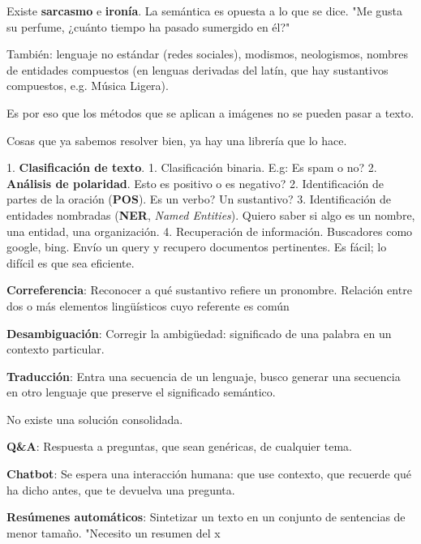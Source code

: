 \documentclass{fmbnotes}
\begin{document}
Existe \textbf{sarcasmo} e \textbf{ironía}. La semántica es opuesta a lo que se dice.
"Me gusta su perfume, ¿cuánto tiempo ha pasado sumergido en él?"

También: lenguaje no estándar (redes sociales), modismos, neologismos, nombres de entidades compuestos (en lenguas derivadas del latín, que hay sustantivos compuestos, e.g. Música Ligera).

Es por eso que los métodos que se aplican a imágenes no se pueden pasar a texto.

\label{sec:soluciones_para_nlp}

\label{sec:consolidadas}
Cosas que ya sabemos resolver bien, ya hay una librería que lo hace. 

1. \textbf{Clasificación de texto}. 
	1. Clasificación binaria. E.g: Es spam o no?
	2. \textbf{Análisis de polaridad}. Esto es positivo o es negativo?
2. Identificación de partes de la oración (\textbf{POS}). Es un verbo? Un sustantivo?
3. Identificación de entidades nombradas (\textbf{NER}, \textit{Named Entities}). Quiero saber si algo es un nombre, una entidad, una organización.
4. Recuperación de información. Buscadores como google, bing. Envío un query y recupero documentos pertinentes. Es fácil; lo difícil es que sea eficiente.

\label{sec:gran_progreso}

\textbf{Correferencia}: Reconocer a qué sustantivo refiere un pronombre. Relación entre dos o más elementos lingüísticos cuyo referente es común

\textbf{Desambiguación}: Corregir la ambigüedad: significado de una palabra en un contexto particular.

\textbf{Traducción}: Entra una secuencia de un lenguaje, busco generar una secuencia en otro lenguaje que preserve el significado semántico.

\label{sec:desafios}
No existe una solución consolidada.

\textbf{Q&A}: Respuesta a preguntas, que sean genéricas, de cualquier tema.

\textbf{Chatbot}: Se espera una interacción humana: que use contexto, que recuerde qué ha dicho antes, que te devuelva una pregunta.

\textbf{Resúmenes automáticos}: Sintetizar un texto en un conjunto de sentencias de menor tamaño. "Necesito un resumen del x%
\label{sec:enfoques_para_soluciones_de_nlp}
\label{sec:enfoque_clasico_basado_en_reglas}
\end{document}
